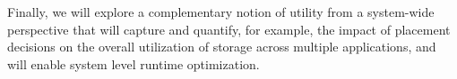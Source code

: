  

Finally, we will explore a complementary notion of utility from a system-wide perspective 
that will capture and quantify, for example, the impact of placement decisions on 
the overall utilization of storage across multiple applications, and will enable system level runtime optimization. 


%
%
%
%

